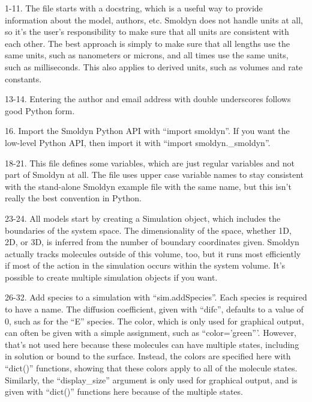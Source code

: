 \documentclass {book}
\begin{document}
\begin{description}

\item{1-11.} The file starts with a docstring, which is a useful way to provide information about the model, authors, etc. Smoldyn does not handle units at all, so it's the user's responsibility to make sure that all units are consistent with each other. The best approach is simply to make sure that all lengths use the same units, such as nanometers or microns, and all times use the same units, such as milliseconds. This also applies to derived units, such as volumes and rate constants.

\item{13-14.} Entering the author and email address with double underscores follows good Python form.

\item{16.} Import the Smoldyn Python API with ``import smoldyn''. If you want the low-level Python API, then import it with ``import smoldyn.\_smoldyn''.

\item{18-21.} This file defines some variables, which are just regular variables and not part of Smoldyn at all. The file uses upper case variable names to stay consistent with the stand-alone Smoldyn example file with the same name, but this isn't really the best convention in Python.

\item{23-24.} All models start by creating a Simulation object, which includes the boundaries of the system space. The dimensionality of the space, whether 1D, 2D, or 3D, is inferred from the number of boundary coordinates given. Smoldyn actually tracks molecules outside of this volume, too, but it runs most efficiently if most of the action in the simulation occurs within the system volume. It's possible to create multiple simulation objects if you want.

\item{26-32.} Add species to a simulation with ``sim.addSpecies''. Each species is required to have a name. The diffusion coefficient, given with ``difc'', defaults to a value of 0, such as for the ``E'' species. The color, which is only used for graphical output, can often be given with a simple assignment, such as ``color='green'''. However, that's not used here because these molecules can have multiple states, including in solution or bound to the surface. Instead, the colors are specified here with ``dict()'' functions, showing that these colors apply to all of the molecule states. Similarly, the ``display\_size'' argument is only used for graphical output, and is given with ``dict()'' functions here because of the multiple states.


\end{description}
\end{document}
